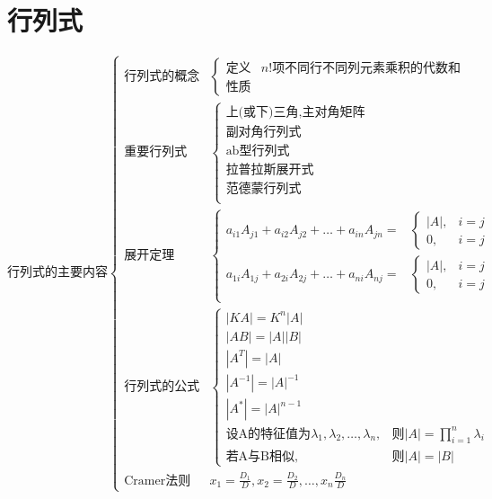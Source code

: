 \documentclass[12pt, a4paper, oneside, UTF8]{ctexbook}
\begin{document}
% 
\else
\fi
\chapter{行列式}

$$
\text{行列式的主要内容}\left\{\begin{matrix}
    \text{行列式的概念}&\left\{\begin{matrix}
    \text{定义}& n!\text{项不同行不同列元素乘积的代数和} \\
    \text{性质}&
    \end{matrix}\right. \\ 
    \text{重要行列式}&\left\{\begin{matrix}
    \text{上(或下)三角,主对角矩阵}\\
    \text{副对角行列式}\\
    \text{ab型行列式}\\
    \text{拉普拉斯展开式}\\
    \text{范德蒙行列式}\\

\end{matrix}\right. \\
    \text{展开定理}& \left\{\begin{matrix}
    a_{i1}A_{j1}+a_{i2}A_{j2}+\ldots+a_{in}A_{jn} = & \left\{\begin{matrix}
    \left | A \right |, &i=j \\
    0,& i = j
\end{matrix}\right. \\
    a_{1i}A_{1j}+a_{2i}A_{2j}+\ldots+a_{ni}A_{nj} = & \left\{\begin{matrix}
    \left | A \right |, &i=j \\
    0,& i = j
\end{matrix}\right. \\
\end{matrix}\right.\\
    \text{行列式的公式}& \left\{\begin{matrix}
    \left | KA \right | = K^n\left | A \right | & \\
    \left | AB \right | = \left | A \right | \left | B \right | &\\
    \left | A^T \right |= \left | A \right |& \\
    \left | A^{-1} \right | = \left | A \right | ^{-1}& \\
    \left | A^{*} \right |=\left | A \right |^{n-1}& \\
    \text{设A的特征值为}\lambda_1,\lambda _2,\ldots,\lambda_n,&\text{则}\left | A \right | =\prod_{i=1}^{n}\lambda_i  \\
    \text{若A与B相似},&\text{则}\left | A \right | =\left | B \right | 
\end{matrix}\right.\\
    \text{Cramer法则}& x_1=\frac{D_1}{D},x_2=\frac{D_2}{D},\ldots,x_n\frac{D_n}{D}
\end{matrix}\right.
$$
\newpage
\end{document}
